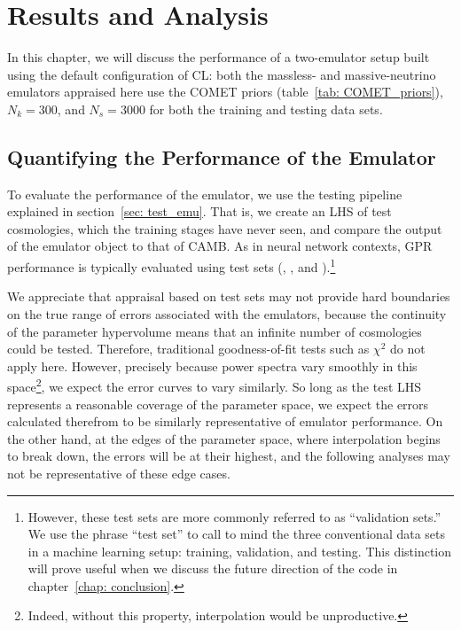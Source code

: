\chapter{Results and Analysis}
\label{chap: results}

In this chapter, we will discuss the performance of a two-emulator setup
built using the default configuration of CL: both the massless- and
massive-neutrino emulators appraised here use the COMET priors
(table~\ref{tab: COMET_priors}), $N_k = 300$, and $N_s = 3000$ for both the
training and testing data sets.

\section{Quantifying the Performance of the Emulator}

To evaluate the performance of the emulator, we use the testing pipeline
explained in section~\ref{sec: test_emu}.
That is, we create an LHS of test cosmologies, which the training stages have
never seen, and compare the output of the emulator object to that of
CAMB. As in neural network contexts, GPR performance is typically evaluated
using test sets (\citealp{Mancini}, \citealp{Arico}, and
\citealp{Eggemeier}).\footnote{However, these test sets are
more commonly referred to as ``validation sets.'' We use the phrase
``test set'' to call to mind the three conventional data sets in a machine
learning setup: training, validation, and testing. This distinction will
prove useful when we discuss the future direction of the code in
chapter~\ref{chap: conclusion}.}

We appreciate that appraisal based on test sets
may not provide hard boundaries on the true
range of errors associated with the emulators,
because the continuity of the parameter hypervolume means that an infinite
number of cosmologies could be tested. Therefore, traditional
goodness-of-fit tests such as $\chi^2$ do not apply here.
However, precisely because
power spectra vary smoothly in this space\footnote{Indeed, without this
property, interpolation would be unproductive.}, we expect the error 
curves to vary similarly. So long as the test LHS represents a reasonable
coverage of the parameter space, we expect the errors calculated therefrom to
be similarly representative of emulator performance. On the other
hand, at the edges of the parameter space, where interpolation begins to
break down, the errors will be at their highest, and the following analyses
may not be representative of these edge cases.

